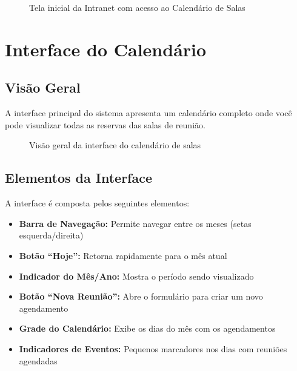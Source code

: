 \documentclass[12pt,a4paper]{article}
\begin{document}
\begin{figure}[H]
    \centering
    \caption{Tela inicial da Intranet com acesso ao Calendário de Salas}
    \label{fig:acesso}
\end{figure}

\newpage

\section{Interface do Calendário}

\subsection{Visão Geral}

A interface principal do sistema apresenta um calendário completo onde você pode visualizar todas as reservas das salas de reunião.

\begin{figure}[H]
    \centering
    \caption{Visão geral da interface do calendário de salas}
    \label{fig:interface}
\end{figure}

\subsection{Elementos da Interface}

A interface é composta pelos seguintes elementos:

\begin{itemize}[leftmargin=*]
    \item \textbf{Barra de Navegação:} Permite navegar entre os meses (setas esquerda/direita)
    \item \textbf{Botão ``Hoje'':} Retorna rapidamente para o mês atual
    \item \textbf{Indicador do Mês/Ano:} Mostra o período sendo visualizado
    \item \textbf{Botão ``Nova Reunião'':} Abre o formulário para criar um novo agendamento
    \item \textbf{Grade do Calendário:} Exibe os dias do mês com os agendamentos
    \item \textbf{Indicadores de Eventos:} Pequenos marcadores nos dias com reuniões agendadas
\end{itemize}

\newpage
\end{document}
